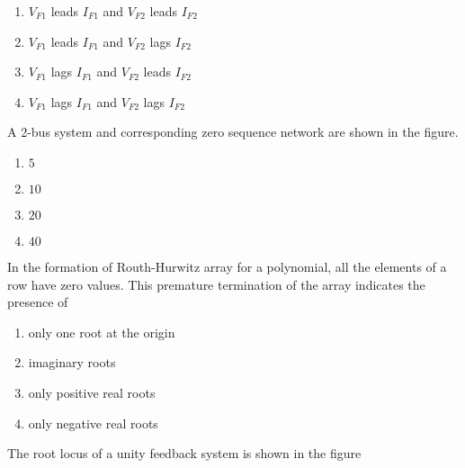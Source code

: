     \begin{enumerate}
        \item $V_{F1}$ leads $I_{F1}$ and $V_{F2}$ leads $I_{F2}$
        \item $V_{F1}$ leads $I_{F1}$ and $V_{F2}$ lags $I_{F2}$
        \item $V_{F1}$ lags $I_{F1}$ and $V_{F2}$ leads $I_{F2}$
        \item $V_{F1}$ lags $I_{F1}$ and $V_{F2}$ lags $I_{F2}$
    \end{enumerate}
   \item A 2-bus system and corresponding zero sequence network are shown in the figure.
    \begin{enumerate}
        \item $5$
        \item $10$
        \item $20$
        \item $40$
    \end{enumerate}
    \item In the formation of Routh-Hurwitz array for a polynomial, all the elements of a row have zero values. This premature termination of the array indicates the presence of 
    \begin{enumerate}
    \item only one root at the origin
    \item imaginary roots
    \item only positive real roots
    \item only negative real roots
    \end{enumerate}
    \item The root locus of a unity feedback system is shown in the figure\\

